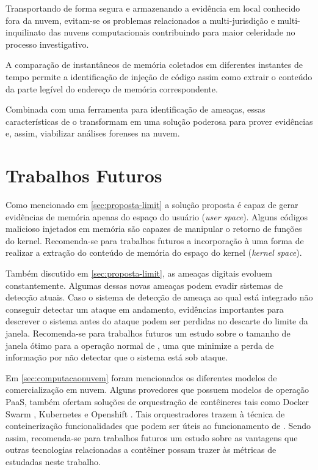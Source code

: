 Transportando de forma segura e armazenando a evidência em local conhecido fora da nuvem, evitam-se os problemas relacionados a multi-jurisdição e multi-inquilinato das nuvens computacionais contribuindo para maior celeridade no processo investigativo.
%

A comparação de instantâneos de memória coletados em diferentes instantes de tempo permite a identificação de injeção de código assim como extrair o conteúdo da parte legível do endereço de memória correspondente.

%
Combinada com uma ferramenta para identificação de ameaças, essas características de \fancyname o transformam em uma solução poderosa para prover evidências e, assim, viabilizar análises forenses na nuvem.

\section{Trabalhos Futuros}
\label{sec: proposta-trab-fut}

%
Como mencionado em \ref{sec:proposta-limit} a solução proposta é capaz de gerar evidências de memória apenas do espaço do usuário (\textit{user space}). 
%
Alguns códigos malicioso injetados em memória são capazes de manipular o retorno de funções do kernel. 
%
Recomenda-se para trabalhos futuros a incorporação à \fancyname uma forma de realizar a extração do conteúdo de memória do espaço do kernel (\textit{kernel space}).
%

Também discutido em \ref{sec:proposta-limit}, as ameaças digitais evoluem constantemente.
%
Algumas dessas novas ameaças podem evadir sistemas de detecção atuais.
%
Caso o sistema de detecção de ameaça ao qual \fancyname está integrado não conseguir detectar um ataque em andamento, evidências importantes para descrever o sistema antes do ataque podem ser perdidas no descarte do limite da janela.
%
Recomenda-se para trabalhos futuros um estudo sobre o tamanho de janela ótimo para a operação normal de \fancyname, uma que minimize a perda de informação por não detectar que o sistema está sob ataque.
%

Em \ref{sec:computacaonuvem} foram mencionados os diferentes modelos de comercialização em nuvem.
%
Alguns provedores que possuem modelos de operação PaaS, também ofertam soluções de orquestração de contêineres tais como Docker Swarm \cite{Swarm}, Kubernetes \cite{Kubernetes} e Openshift \cite{Openshift}.
%
Tais orquestradores trazem à técnica de conteinerização funcionalidades que podem ser úteis ao funcionamento de \fancynameX.
%
Sendo assim, recomenda-se para trabalhos futuros um estudo sobre as vantagens que outras tecnologias relacionadas a contêiner possam trazer às métricas de \fancyname estudadas neste trabalho.
%

